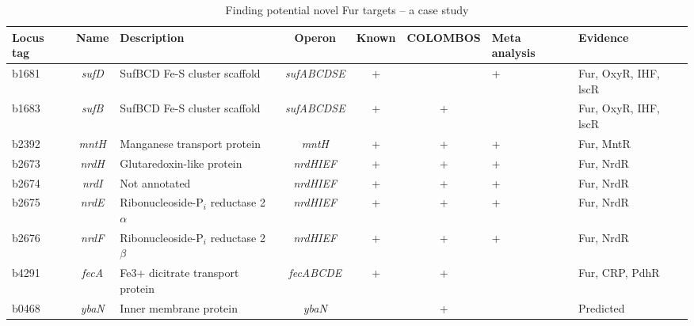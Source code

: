 %
\begin{sidewaystable}
\centering
\caption{Finding potential novel Fur targets – a case study}
\label{tab:colTB-case}
\begin{scriptsize}
\begin{tabular}{ l c >{\raggedright}p{4cm} c c c 
>{\centering\arraybackslash}p{1.2cm} >{\raggedright\arraybackslash}p{4cm} }
	\toprule
	\textbf{{\scriptsize Locus tag}} & \textbf{{\scriptsize Name}} & 
	\textbf{{\scriptsize Description}} & \textbf{{\scriptsize Operon}} & 
	\textbf{{\scriptsize Known}} & \textbf{{\scriptsize COLOMBOS}} & 
	\textbf{{\scriptsize Meta analysis}} & \textbf{{\scriptsize Evidence}} \\
	\midrule
	
	b1681 & \textit{sufD} & SufBCD Fe-S cluster scaffold & \textit{sufABCDSE} & 
	+ &		& + & Fur, OxyR, IHF, lscR \\[1ex]
	
	b1683 & \textit{sufB} & SufBCD Fe-S cluster scaffold & \textit{sufABCDSE} & 
	+ & + 	& 	& Fur, OxyR, IHF, lscR \\[1ex]
	
	b2392 & \textit{mntH} & Manganese transport protein & \textit{mntH} & 
	+ & + 	& + & Fur, MntR \\[1ex]
	
	b2673 & \textit{nrdH} & Glutaredoxin-like protein 	& \textit{nrdHIEF} &
	+ & + 	& + & Fur, NrdR \\[1ex]
	
	b2674 & \textit{nrdI} & Not annotated 				& \textit{nrdHIEF} & 
	+ & + 	& + & Fur, NrdR \\[1ex]
	
	b2675 & \textit{nrdE} & Ribonucleoside-P$_i$ reductase 2 $\alpha$ & 
	\textit{nrdHIEF} & 
	+ & + 	& + & Fur, NrdR \\[1ex]
	
	b2676 & \textit{nrdF} & Ribonucleoside-P$_i$ reductase 2 $\beta$ & 
	\textit{nrdHIEF} & 
	+ & + 	& + & Fur, NrdR \\[1ex]
	
	b4291 & \textit{fecA} & Fe3+ dicitrate transport protein & 
	\textit{fecABCDE} & 
	+ & + 	& 	& Fur, CRP, PdhR \\[1ex]
	
	b0468 & \textit{ybaN} & Inner membrane protein 		& \textit{ybaN} & 
	  & + 	& 	& Predicted \\[1ex]
	  

\end{tabular}
\end{scriptsize}
\end{sidewaystable}

